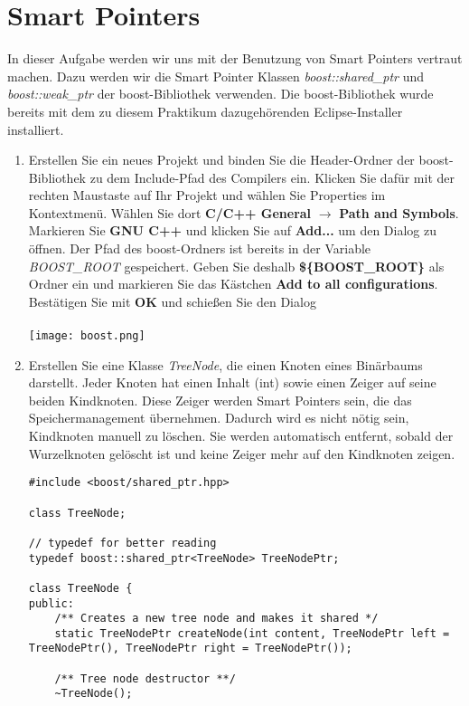 \documentclass[
  accentcolor=tud1c,	%
  colorbacktitle,		%
  inverttitle,			%
  german,				%
  twoside
]{tudexercise}
\begin{document}
\section{Smart Pointers}
In dieser Aufgabe werden wir uns mit der Benutzung von Smart Pointers vertraut machen. Dazu werden wir die Smart Pointer Klassen \emph{boost::shared\_ptr} und \emph{boost::weak\_ptr} der boost-Bibliothek verwenden. Die boost-Bibliothek wurde bereits mit dem zu diesem Praktikum dazugehörenden Eclipse-Installer installiert. 

\begin{enumerate}
\item Erstellen Sie ein neues Projekt und binden Sie die Header-Ordner der boost-Bibliothek zu dem Include-Pfad des Compilers ein. Klicken Sie dafür mit der rechten Maustaste auf Ihr Projekt und wählen Sie Properties
im Kontextmenü. Wählen Sie dort \textbf{C/C++ General} $\rightarrow$ \textbf{Path and Symbols}. Markieren Sie \textbf{GNU C++} und klicken Sie auf \textbf{Add...} um den Dialog zu öffnen. Der Pfad des boost-Ordners ist bereits in der Variable \emph{BOOST\_ROOT} gespeichert. Geben Sie deshalb \textbf{\$\{BOOST\_ROOT\}} als Ordner ein und markieren Sie das Kästchen \textbf{Add to all configurations}. Bestätigen Sie mit \textbf{OK} und schießen Sie den Dialog\\\\
\texttt{[image: boost.png]}

\item Erstellen Sie eine Klasse \emph{TreeNode}, die einen Knoten eines Binärbaums darstellt. Jeder Knoten hat einen Inhalt (int) sowie einen Zeiger auf seine beiden Kindknoten. Diese Zeiger werden Smart Pointers sein, die das Speichermanagement übernehmen. Dadurch wird es nicht nötig sein, Kindknoten manuell zu löschen. Sie werden automatisch entfernt, sobald der Wurzelknoten gelöscht ist und keine Zeiger mehr auf den Kindknoten zeigen.

\begin{lstlisting}
#include <boost/shared_ptr.hpp>

class TreeNode;

// typedef for better reading
typedef boost::shared_ptr<TreeNode> TreeNodePtr;

class TreeNode {
public:
	/** Creates a new tree node and makes it shared */
	static TreeNodePtr createNode(int content, TreeNodePtr left = TreeNodePtr(), TreeNodePtr right = TreeNodePtr());

	/** Tree node destructor **/
	~TreeNode();


\end{lstlisting}
\end{enumerate}
\end{document}
